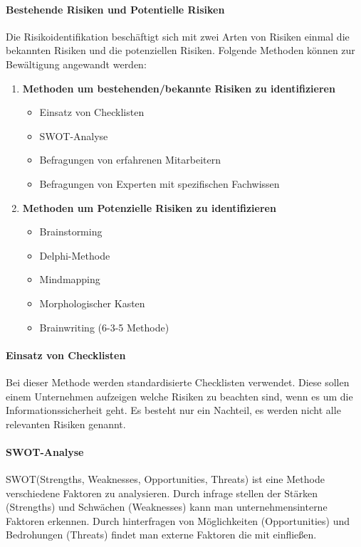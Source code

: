 \paragraph{Bestehende Risiken und Potentielle Risiken}
Die Risikoidentifikation beschäftigt sich mit zwei Arten von Risiken einmal die bekannten Risiken und die potenziellen Risiken. Folgende Methoden können zur Bewältigung angewandt werden:
\begin{enumerate}
    \item \textbf{Methoden um bestehenden/bekannte Risiken zu identifizieren}
    \begin{itemize}
        \item Einsatz von Checklisten
        \item SWOT-Analyse
        \item Befragungen von erfahrenen Mitarbeitern
        \item Befragungen von Experten mit spezifischen Fachwissen
    \end{itemize}
    \item \textbf{Methoden um Potenzielle Risiken zu identifizieren}
    \begin{itemize}
    	\item Brainstorming
    	\item Delphi-Methode
    	\item Mindmapping
    	\item Morphologischer Kasten
    	\item Brainwriting (6-3-5 Methode)
    \end{itemize}
\end{enumerate}

\paragraph{Einsatz von Checklisten}
Bei dieser Methode werden standardisierte Checklisten verwendet. Diese sollen einem Unternehmen aufzeigen welche Risiken zu beachten sind, wenn es um die Informationssicherheit geht. Es besteht nur ein Nachteil, es werden nicht alle relevanten Risiken genannt.

\paragraph{SWOT-Analyse}
SWOT(Strengths, Weaknesses, Opportunities, Threats) ist eine Methode verschiedene Faktoren zu analysieren. Durch infrage stellen der Stärken (Strengths) und Schwächen (Weaknesses) kann man unternehmensinterne Faktoren erkennen. Durch hinterfragen von Möglichkeiten (Opportunities) und Bedrohungen (Threats) findet man externe Faktoren die mit einfließen.

